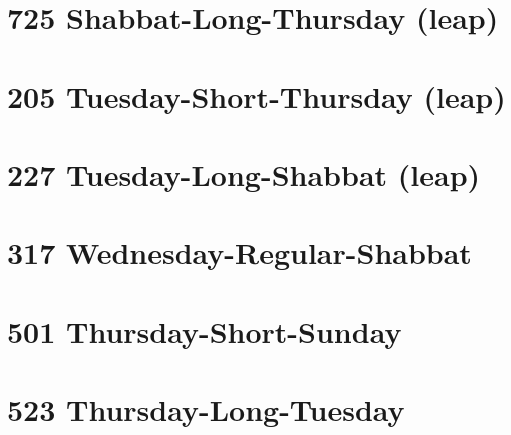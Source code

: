\section{725 Shabbat-Long-Thursday (leap)}
\label{725}
\tishreiShab

\section{205 Tuesday-Short-Thursday (leap)}
\label{205}

\section{227 Tuesday-Long-Shabbat (leap)}
\label{227}

\section{317 Wednesday-Regular-Shabbat}
\label{317}

\section{501 Thursday-Short-Sunday}
\label{501}

\section{523 Thursday-Long-Tuesday}
\label{523}